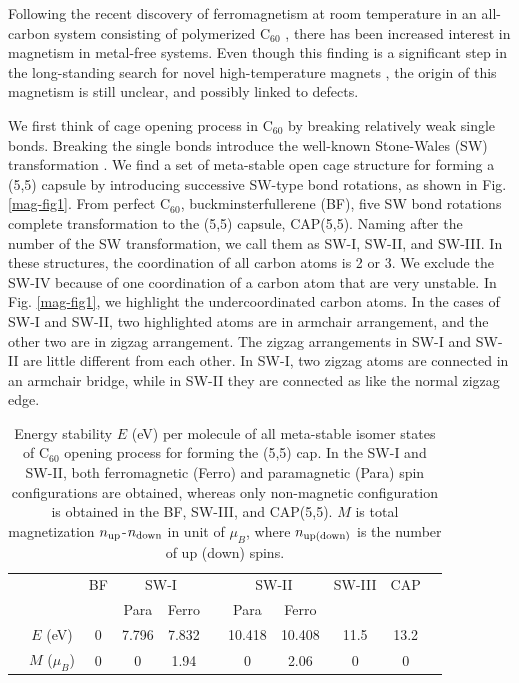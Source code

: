 \documentclass[doctor,english,final]{kaist-ucs}
\begin{document}
Following the recent discovery of ferromagnetism at room temperature
in an all-carbon system consisting of polymerized C$_{60}$
\cite{Makarova01}, there has been increased interest in magnetism in
metal-free systems.
Even though this finding is a significant step in
the long-standing search for novel high-temperature magnets
\cite{Palacio01}, the origin of this magnetism is still unclear, and
possibly linked to defects.

We first think of cage opening process in C$_{60}$ by breaking relatively weak
single bonds. Breaking the single bonds introduce the well-known Stone-Wales (SW)
transformation \cite{SW}.
We find a set of meta-stable open cage structure for forming a (5,5) capsule
by introducing successive SW-type bond rotations, as shown in Fig. \ref{mag-fig1}.
From perfect C$_{60}$, buckminsterfullerene (BF), five SW bond rotations complete
transformation to the (5,5) capsule, CAP(5,5).
Naming after the number of the SW transformation, we call them as SW-I, SW-II, and
SW-III.
In these structures, the coordination of all carbon atoms is 2 or 3.
We exclude the SW-IV because of one coordination of a carbon atom that are very
unstable.
In Fig. \ref{mag-fig1}, we highlight the undercoordinated carbon atoms.
In the cases of SW-I and SW-II, two highlighted atoms are in armchair arrangement,
and the other two are in zigzag arrangement.
The zigzag arrangements in SW-I and SW-II are little different from each other.
In SW-I, two zigzag atoms are connected in an armchair bridge, while in SW-II they
are connected as like the normal zigzag edge.

\begin{table}[t]
\caption{Energy stability $E$ (eV) per molecule of all meta-stable
isomer states of C$_{60}$ opening process for forming the (5,5) cap.
In the SW-I and SW-II, both ferromagnetic (Ferro) and paramagnetic (Para)
spin configurations are obtained, whereas only non-magnetic configuration
is obtained in the BF, SW-III, and CAP(5,5).
$M$ is total magnetization $n_{\rm up}$-$n_{\rm down}$ in unit of $\mu_B$, where
$n_{\rm up(down)}$ is the number of up (down) spins.
}
\label{mag-tab1}
\begin{center}
\begin{tabular} {ccccccccccc}
\hline\hline
& & BF &\multicolumn{2}{c}{SW-I}&&\multicolumn{2}{c}{SW-II}&SW-III&CAP&\\
\cline{4-5} \cline{7-8}
&               &   &  Para & Ferro &&   Para &  Ferro &      &      &\\
\hline
& $E$ (eV)      & 0 & 7.796 & 7.832 && 10.418 & 10.408 & 11.5 & 13.2 &\\
& $M$ ($\mu_B$) & 0 &     0 &  1.94 &&      0 &   2.06 &    0 &    0 &\\
\hline\hline
\end{tabular}
\end{center}
\end{table}
\end{document}
